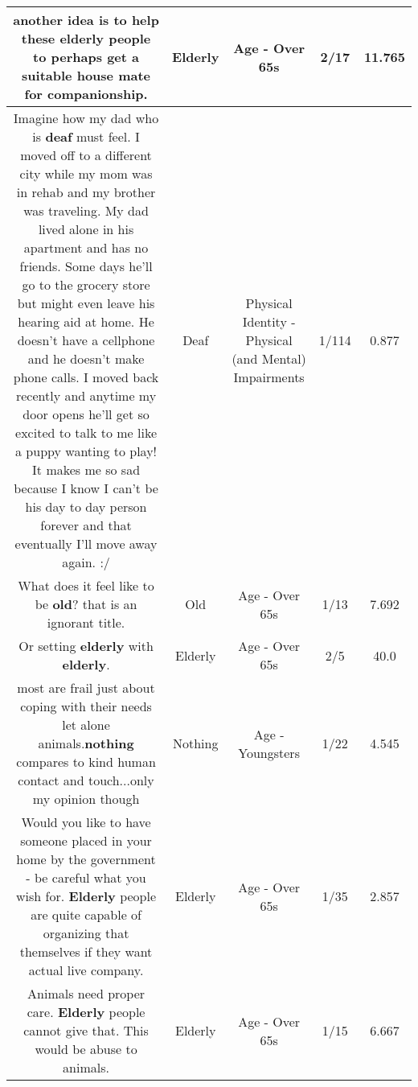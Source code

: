 \documentclass[11pt]{article}
\newlength\mylength
\begin{document}
\begin{center}
\begin{longtable}{|C{.65\mylength}|C{.30\mylength}|C{.12\mylength}|C{.12\mylength}|C{.12\mylength}|}
  \small another idea is to help these \textbf{elderly} people to perhaps get a suitable house mate for companionship.\normalsize   & Elderly & Age - Over 65s & 2/17 & 11.765 \\  \hline
  \small Imagine how my dad who is \textbf{deaf} must feel. I moved off to a different city while my mom was in rehab and my brother was traveling. My dad lived alone in his apartment and has no friends. Some days he'll go to the grocery store but might even leave his hearing aid at home. He doesn't have a cellphone and he doesn't make phone calls. I moved back recently and anytime my door opens he'll get so excited to talk to me like a puppy wanting to play! It makes me so sad because I know I can't be his day to day person forever and that eventually I'll move away again. :/\normalsize   & Deaf & Physical Identity - Physical (and Mental) Impairments & 1/114 & 0.877 \\  \hline
  \small What does it feel like to be \textbf{old}? that is an ignorant title.\normalsize   & Old & Age - Over 65s & 1/13 & 7.692 \\  \hline
  \small Or setting \textbf{elderly} with \textbf{elderly}.\normalsize   & Elderly & Age - Over 65s & 2/5 & 40.0 \\  \hline
  \small most are frail just about coping with their needs let alone animals.\textbf{nothing} compares to kind human contact and touch...only my opinion though\normalsize   & Nothing & Age - Youngsters & 1/22 & 4.545 \\  \hline
  \small Would you like to have someone placed in your home by the government - be careful what you wish for. \textbf{Elderly} people are quite capable of organizing that themselves if they want actual live company.\normalsize   & Elderly & Age - Over 65s & 1/35 & 2.857 \\  \hline
  \small Animals need proper care. \textbf{Elderly} people cannot give that. This would be abuse to animals.\normalsize   & Elderly & Age - Over 65s & 1/15 & 6.667 \\  \hline

\end{longtable}
\end{center}
\end{document}
